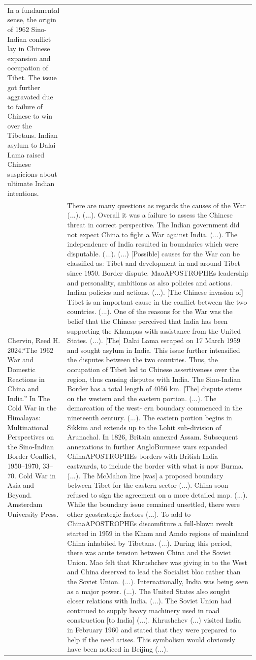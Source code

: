 {\begin{longtable}{p{}p{}}
In a fundamental sense, the origin of 1962 Sino-Indian conflict lay in Chinese expansion and occupation of Tibet. The issue got further aggravated due to failure of Chinese to win over the Tibetans. Indian asylum to Dalai Lama raised Chinese suspicions about ultimate Indian intentions.
\\
Chervin, Reed H. 2024.“The 1962 War and Domestic Reactions in China and India.” In The Cold War in the Himalayas: Multinational Perspectives on the Sino-Indian Border Conflict, 1950–1970, 33–70. Cold War in Asia and Beyond. Amsterdam University Press. & There are many questions as regards the causes of the War (...). (...). Overall it was a failure to assess the Chinese threat in correct perspective. The Indian government did not expect China to fight a War against India. (...). The independence of India resulted in boundaries which were disputable. (...). (...) [Possible] causes for the War can be classified as: Tibet and development in and around Tibet since 1950. Border dispute. MaoAPOSTROPHEs leadership and personality, ambitions as also policies and actions. Indian policies and actions. (...). 
[The Chinese invasion of] Tibet is an important cause in the conflict between the two countries. (...). One of the reasons for the War was the belief that the Chinese perceived that India has been supporting the Khampas with assistance from the United States. (...). [The] Dalai Lama escaped on 17 March 1959 and sought asylum in India. This issue further intensified the disputes between the two countries. Thus, the occupation of Tibet led to Chinese assertiveness over the region, thus causing disputes with India. 
The Sino-Indian Border has a total length of 4056 km. [The] dispute stems on the western and the eastern portion. (...). The demarcation of the west- ern boundary commenced in the nineteenth century. (...). The eastern portion begins in Sikkim and extends up to the Lohit sub-division of Arunachal. In 1826, Britain annexed Assam. Subsequent annexations in further AngloBurmese wars expanded ChinaAPOSTROPHEs borders with British India eastwards, to include the border with what is now Burma. (...). The McMahon line [was] a proposed boundary between Tibet for the eastern sector (...). China soon refused to sign the agreement on a more detailed map. (...). 
While the boundary issue remained unsettled, there were other geostrategic factors (...). To add to ChinaAPOSTROPHEs discomfiture a full-blown revolt started in 1959 in the Kham and Amdo regions of mainland China inhabited by Tibetans. (...). During this period, there was acute tension between China and the Soviet Union. Mao felt that Khrushchev was giving in to the West and China deserved to lead the Socialist bloc rather than the Soviet Union. (...). Internationally, India was being seen as a major power. (...). The United States also sought closer relations with India. (...). The Soviet Union had continued to supply heavy machinery used in road construction [to India] (...). Khrushchev (...) visited India in February 1960 and stated that they were prepared to help if the need arises. This symbolism would obviously have been noticed in Beijing (...).

\end{longtable}}
